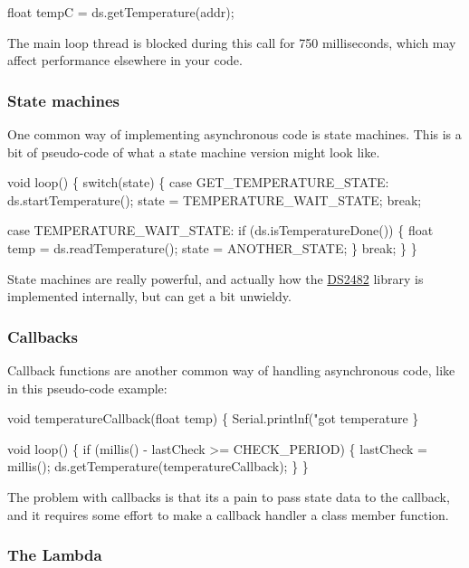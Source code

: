 \begin{DoxyCode}
float tempC = ds.getTemperature(addr);
\end{DoxyCode}


The main loop thread is blocked during this call for 750 milliseconds, which may affect performance elsewhere in your code.

\subsubsection*{State machines}

One common way of implementing asynchronous code is state machines. This is a bit of pseudo-\/code of what a state machine version might look like.


\begin{DoxyCode}
void loop() \{
    switch(state) \{
    case GET\_TEMPERATURE\_STATE:
        ds.startTemperature();
        state = TEMPERATURE\_WAIT\_STATE;
        break;

    case TEMPERATURE\_WAIT\_STATE:
        if (ds.isTemperatureDone()) \{
            float temp = ds.readTemperature();
            state = ANOTHER\_STATE;
        \}
        break;
    \}
\}
\end{DoxyCode}


State machines are really powerful, and actually how the \mbox{\hyperlink{class_d_s2482}{D\+S2482}} library is implemented internally, but can get a bit unwieldy.

\subsubsection*{Callbacks}

Callback functions are another common way of handling asynchronous code, like in this pseudo-\/code example\+:


\begin{DoxyCode}
void temperatureCallback(float temp) \{
    Serial.printlnf("got temperature %
\}

void loop() \{
    if (millis() - lastCheck >= CHECK\_PERIOD) \{
        lastCheck = millis();
        ds.getTemperature(temperatureCallback);
    \}
\}
\end{DoxyCode}


The problem with callbacks is that it\textquotesingle{}s a pain to pass state data to the callback, and it requires some effort to make a callback handler a class member function.

\subsubsection*{The Lambda}

